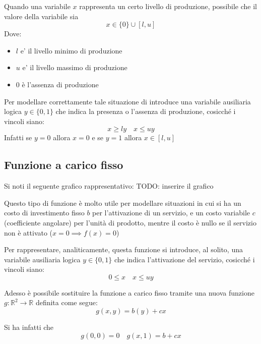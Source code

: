 Quando una variabile $x$ rappresenta un certo livello di produzione, possibile che il valore della variabile sia 
\[
  x  \in \{0\} \cup [l,u]
\] 
Dove:
\begin{itemize}
  \item $ l $ e' il livello minimo di produzione
  \item $ u $ e' il livello massimo di produzione
  \item 0 è l'assenza di produzione
\end{itemize}
Per modellare correttamente tale situazione di introduce una variabile ausiliaria logica $y\in \{0,1\}$ che indica la presenza o l'assenza di produzione, cosicché i vincoli siano:
\[
  x \geq ly \quad x \leq uy
\]
Infatti se $y=0$ allora $x=0$ e se $y=1$ allora $x\in [l,u]$

\subsection{Funzione a carico fisso}
Si noti il seguente grafico rappresentativo:
TODO: inserire il grafico

Questo tipo di funzione è molto utile per modellare situazioni in cui si ha un costo di investimento fisso $b$ per l'attivazione di un servizio, e un costo variabile $c$ (coefficiente angolare) per l'unità di prodotto, mentre il costo è nullo se il servizio non è attivato ($x= 0 \implies f(x) = 0$)

Per rappresentare, analiticamente, questa funzione si introduce, al solito, una variabile ausiliaria logica $y\in \{0,1\}$ che indica l'attivazione del servizio, cosicché i vincoli siano:
\[
  0\leq x \quad x \leq uy 
\]

Adesso è possibile sostituire la funzione a carico fisso tramite una nuova funzione $g:\mathbb{R}^2\to\mathbb{R}$ definita come segue:
\[
  g(x,y) = b(y) + cx
\]

Si ha infatti che
\[
  g(0,0) = 0 \quad g(x,1) = b + cx
\]

